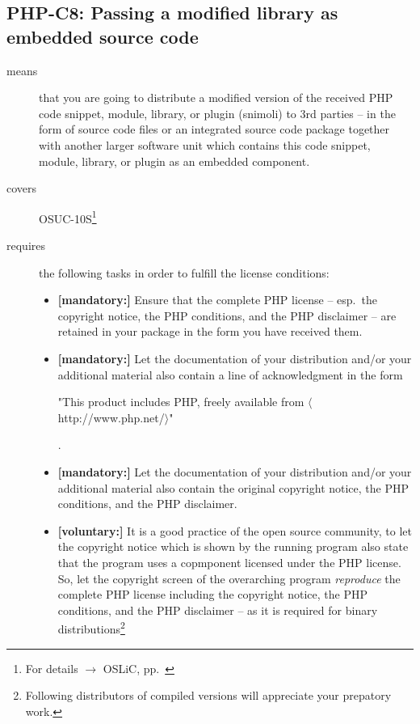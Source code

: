 \subsection{PHP-C8: Passing a modified library as embedded source code}
\label{OSUC-10S-PHP}
\begin{description}
\item[means] that you are going to distribute a modified version of the received
PHP code snippet, module, library, or plugin (snimoli) to 3rd parties -- in the
form of source code files or an integrated source code package together with
another larger software unit which contains this code snippet, module, library,
or plugin as an embedded component.
\item[covers] OSUC-10S\footnote{For details $\rightarrow$ OSLiC, pp.\
\pageref{OSUC-10S-DEF}}
\item[requires] the following tasks in order to fulfill the license conditions:
\begin{itemize}
  
  \item \textbf{[mandatory:]} Ensure that the complete PHP license -- esp.\
  the copyright notice, the PHP conditions, and the PHP disclaimer -- are
  retained in your package in the form you have received them.
  
  \item \textbf{[mandatory:]} Let the documentation of your distribution and/or
  your additional material also contain a line of acknowledgment in the form
   \begin{footnotesize}"This product includes PHP, freely available from
  $\langle$http://www.php.net/$\rangle$"\end{footnotesize}.
    
  \item \textbf{[mandatory:]} Let the documentation of your distribution and/or
  your additional material also contain the original copyright notice, the PHP
  conditions, and the PHP disclaimer.

  \item \textbf{[voluntary:]} It is a good practice of the open source
  community, to let the copyright notice which is shown by the running program
  also state that the program uses a copmponent licensed under the PHP license.
  So, let the copyright screen of the overarching program \emph{reproduce} the
  complete PHP license including the copyright notice, the PHP conditions, and
  the PHP disclaimer -- as it is required for binary
  distributions\footnote{Following distributors of compiled versions will
  appreciate your prepatory work.}
  

\end{itemize}
\end{description}
